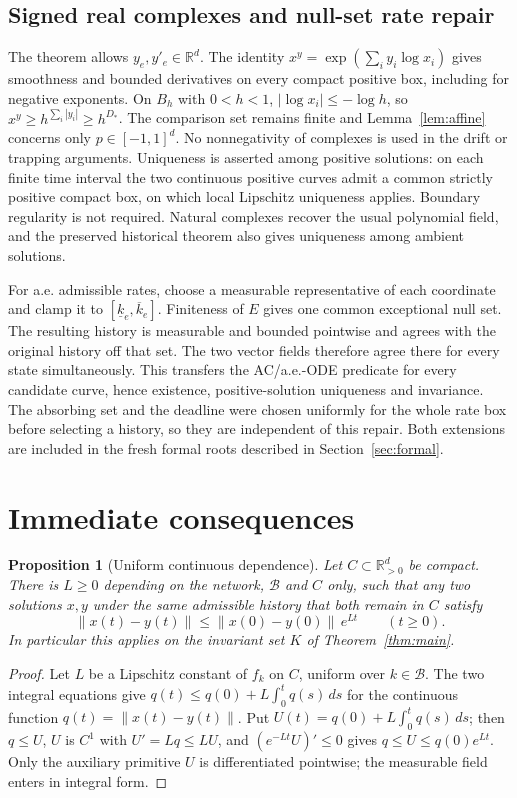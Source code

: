 \documentclass[11pt]{article}
\newtheorem{proposition}[theorem]{Proposition}
\theoremstyle{definition}
\theoremstyle{remark}
\newcommand{\R}{\mathbb R}
\newcommand{\U}{\R_{>0}^{d}}
\newcommand{\B}{\mathcal B}
\newcommand{\norm}[1]{\left\|#1\right\|}
\begin{document}
\subsection{Signed real complexes and null-set rate repair}\label{sec:real}

The theorem allows $y_e,y'_e\in\R^d$. The identity
$x^y=\exp(\sum_i y_i\log x_i)$ gives smoothness and bounded derivatives on every
compact positive box, including for negative exponents. On $B_h$ with $0<h<1$,
$|\log x_i|\le-\log h$, so $x^y\ge h^{\sum_i|y_i|}\ge h^{D_*}$.
The comparison set remains finite and Lemma~\ref{lem:affine} concerns only
$p\in[-1,1]^d$. No nonnegativity of complexes is used in the drift or trapping
arguments. Uniqueness is asserted among positive solutions: on each finite time
interval the two continuous positive curves admit a common strictly positive
compact box, on which local Lipschitz uniqueness applies. Boundary regularity is
not required. Natural complexes recover the usual polynomial field, and the
preserved historical theorem also gives uniqueness among ambient solutions.

For a.e. admissible rates, choose a measurable representative of each coordinate
and clamp it to $[\underline k_e,\overline k_e]$. Finiteness of $E$ gives one
common exceptional null set. The resulting history is measurable and bounded
pointwise and agrees with the original history off that set. The two vector
fields therefore agree there for every state simultaneously. This transfers
the AC/a.e.-ODE predicate for every candidate curve, hence existence,
positive-solution uniqueness and invariance. The absorbing set and the deadline
were chosen uniformly for the whole rate box before selecting a history, so
they are independent of this repair. Both extensions are included in the fresh
formal roots described in Section~\ref{sec:formal}.

\section{Immediate consequences}\label{sec:consequences}

\begin{proposition}[Uniform continuous dependence]\label{prop:dependence}
Let $C\subset\U$ be compact. There is $L\ge0$ depending on the network, $\B$ and
$C$ only, such that any two solutions $x,y$ under the same admissible history that
both remain in $C$ satisfy
\begin{equation}\label{eq:gronwall}
 \norm{x(t)-y(t)}\le\norm{x(0)-y(0)}\,e^{Lt}\qquad(t\ge0).
\end{equation}
In particular this applies on the invariant set $K$ of Theorem~\ref{thm:main}.
\end{proposition}
\begin{proof}
Let $L$ be a Lipschitz constant of $f_k$ on $C$, uniform over $k\in\B$. The two
integral equations give $q(t)\le q(0)+L\int_0^t q(s)\,ds$ for the continuous
function $q(t)=\norm{x(t)-y(t)}$. Put $U(t)=q(0)+L\int_0^tq(s)\,ds$; then $q\le U$,
$U$ is $C^1$ with $U'=Lq\le LU$, and $(e^{-Lt}U)'\le0$ gives $q\le U\le q(0)e^{Lt}$.
Only the auxiliary primitive $U$ is differentiated pointwise; the measurable field
enters in integral form.
\end{proof}
\end{document}
